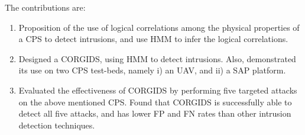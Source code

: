 The contributions are:
\begin{enumerate}
\item Proposition of the use of logical correlations among the physical properties of a \ac{CPS} to detect intrusions, and use \ac{HMM} to infer the logical correlations.
\item Designed a \acf{CORGIDS}, using \ac{HMM} to detect intrusions. Also, demonstrated its use on two \ac{CPS} test-beds, namely i) an \ac{UAV}, and ii) a \acf{SAP} platform.
\item Evaluated the effectiveness of \ac{CORGIDS} by performing five targeted attacks on the above mentioned \ac{CPS}. Found that \ac{CORGIDS} is successfully able to detect all five attacks, and has lower \acf{FP} and \acf{FN} rates than other intrusion detection techniques.
\end{enumerate}

\endinput
